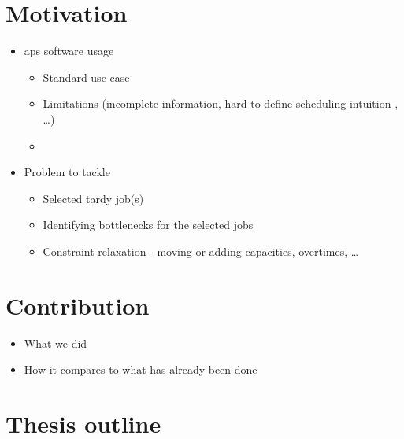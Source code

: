 
\section*{Motivation}

\begin{itemize}
    \item \ac{aps} software usage
    \begin{itemize}
        \item Standard use case
        \item Limitations (incomplete information, hard-to-define scheduling intuition , \dots)
        \item {}
    \end{itemize}

    \item Problem to tackle
    \begin{itemize}
        \item Selected tardy job(s)
        \item Identifying bottlenecks for the selected jobs
        \item Constraint relaxation - moving or adding capacities, overtimes, \dots
    \end{itemize}
\end{itemize}

\section*{Contribution}

\begin{itemize}
    \item What we did
    \item How it compares to what has already been done
\end{itemize}

\section*{Thesis outline}

